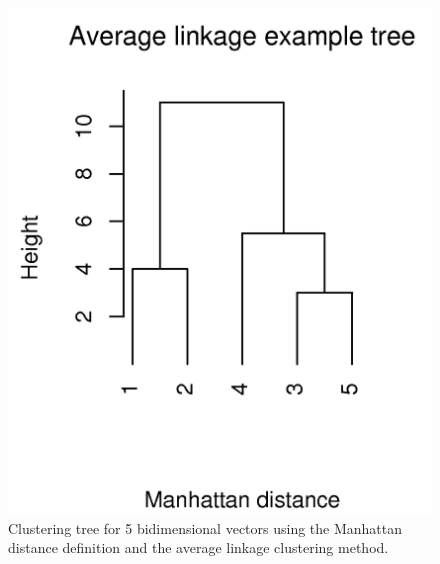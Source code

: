 \begin{figure}[t]
\centering
\includegraphics[scale=0.4]{Appendix/appendixtree.png}
\caption{Clustering tree for 5 bidimensional vectors using the Manhattan
distance definition and the average linkage clustering method.}
\label{fig:tree}
\end{figure}







